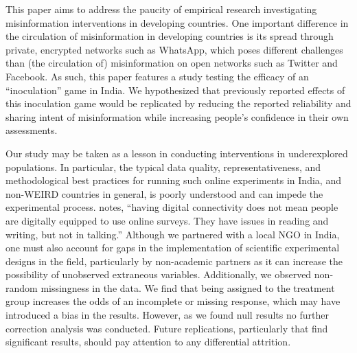 \documentclass[empirical, authordate, issue]{jote-new-article}
\begin{document}
\begin{originalPurpose}
  This paper aims to address the paucity of empirical research investigating misinformation interventions in developing countries. One important difference in the circulation of misinformation in developing countries is its spread through private, encrypted networks such as \mbox{WhatsApp}, which poses different challenges than (the circulation of) misinformation on open networks such as Twitter and Facebook. As such, this paper features a study testing the efficacy of an “inoculation” game in India. We hypothesized that previously reported effects of this inoculation game would be replicated by reducing the reported reliability and sharing intent of misinformation while increasing people's confidence in their own assessments.
\end{originalPurpose}

Our study may be taken as a lesson in conducting interventions in underexplored populations. In particular, the typical data quality, representativeness, and methodological best practices for running such online experiments in India, and non-WEIRD countries in general, is poorly understood and can impede the experimental process. \textcite{Campbell-Smith2019} notes, “having digital connectivity does not mean people are digitally equipped to use online surveys. They have issues in reading and writing, but not in talking.” Although we partnered with a local NGO in India, one must also account for gaps in the implementation of scientific experimental designs in the field, particularly by non-academic partners as it can increase the possibility of unobserved extraneous variables. Additionally, we observed non-random missingness in the data. We find that being assigned to the treatment group increases the odds of an incomplete or missing response, which may have introduced a bias in the results. However, as we found null results no further correction analysis was conducted. Future replications, particularly that find significant results, should pay attention to any differential attrition.
\end{document}
